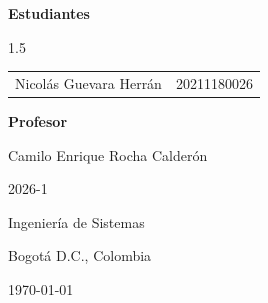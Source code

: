 \begin{titlepage}
	{\large
		\textbf{Estudiantes}
		\par}
	
	\vspace{0.2cm}
	
	\large
	
	\begin{spacing}{1.5}
		
		\begin{tabular}{@{}ll@{}}
			\toprule
			
			Nicolás Guevara Herrán & 20211180026 \\
			
			
		\end{tabular}
		
	\end{spacing}
	
	\vspace{0.7cm}
	
	
	{\large
		\textbf{Profesor}
		\par}
	
	\vspace{0.25cm}
	
	{\large
		Camilo Enrique Rocha Calderón
		\par}
	
	\vfill
	
	
	{\large
		2026-1
		\par}
	
	\vspace{0.25cm}
	
	{\large
		Ingeniería de Sistemas
		\par}
	
	\vspace{0.2cm}
	
	{\large
		Bogotá D.C., Colombia
		\par}
	
	\vspace{0.2cm}
	
	{\large
		\today
		\par}
	
\end{titlepage}